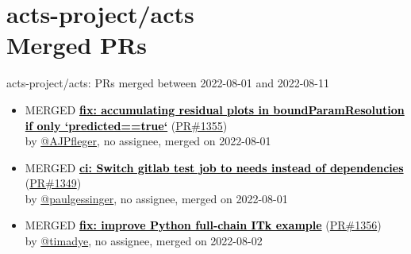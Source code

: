 \providecommand{\prmerged}{MERGED }
\providecommand{\propen}{OPEN }
\providecommand{\prwip}{WIP }
\providecommand{\prstale}{STALE }
\providecommand{\iss}{}
    

\providecommand{\cusemoji}[1]{}
\providecommand{\emojispace}[1]{}









\section{ acts-project/acts \\ Merged PRs}
\begin{frame}[allowframebreaks]{ acts-project/acts: PRs merged 
between 2022-08-01 and 2022-08-11
}

  \begin{itemize}
    
    \item\prmerged
    \hspace*{0.1em}
    \textbf{\href{https://github.com/acts-project/acts/pull/1355}{\textcolor{black}{fix: accumulating residual plots in boundParamResolution if only `predicted==true`}}}
    (\href{https://github.com/acts-project/acts/pull/1355}{PR\#1355}) \\
    by \href{https://github.com/AJPfleger}{@AJPfleger}, {}no assignee, merged on 2022-08-01

    \item\prmerged
    \hspace*{0.1em}
    \textbf{\href{https://github.com/acts-project/acts/pull/1349}{\textcolor{black}{ci: Switch gitlab test job to needs instead of dependencies}}}
    (\href{https://github.com/acts-project/acts/pull/1349}{PR\#1349}) \\
    by \href{https://github.com/paulgessinger}{@paulgessinger}, {}no assignee, merged on 2022-08-01

    \item\prmerged
    \hspace*{0.1em}
    \textbf{\href{https://github.com/acts-project/acts/pull/1356}{\textcolor{black}{fix: improve Python full-chain ITk example}}}
    (\href{https://github.com/acts-project/acts/pull/1356}{PR\#1356}) \\
    by \href{https://github.com/timadye}{@timadye}, {}no assignee, merged on 2022-08-02


\end{itemize}
\end{frame}
